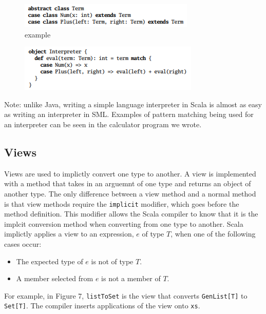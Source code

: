 \documentclass[jou,apacite]{IEEEtran}
\begin{document}
\begin{figure}[h]
  \centering
  \includegraphics[width=\columnwidth]{abstract_class}
  \caption{example}
  \label{fig:example}
\end{figure}

\begin{figure}[h]
  \centering
  \includegraphics[width=\columnwidth]{pattern_match}
  \caption{}
  \label{fig:example}
\end{figure}

Note: unlike Java, writing a simple language interpreter in Scala is almost as easy as writing an interpreter in SML. Examples of pattern matching being used for an interpreter can be seen in the calculator program we wrote.

\subsection{Views}
Views are used to implictly convert one type to another. A view is implemented
with a method that takes in an arguemnt of one type and returns an object of
another type. The only difference between a view method and a normal method is
that view methods require the \texttt{implicit} modifier, which goes before the
method definition. This modifier allows the Scala compiler to know that it is
the implcit conversion method when converting from one type to another. Scala
implictly applies a view to an expression, $e$ of type $T$, when one of the
following cases occur:
\begin{itemize}
\item The expected type of $e$ is not of type $T$.
\item A member selected from $e$ is not a member of $T$.
\end{itemize}  
For example, in Figure 7, \texttt{listToSet} is the view that converts \texttt{GenList[T]} to \texttt{Set[T]}. The compiler inserts applications of the view onto \texttt{xs}.
\end{document}

